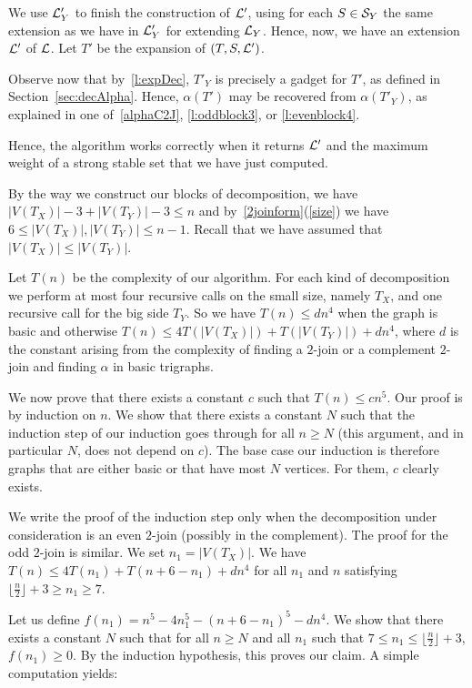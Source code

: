 \documentclass[11 pt] {article}
\newcounter{claim}
\begin{document}
We use ${\cal L}'_Y$ to finish the construction of ${\cal L}'$, 
using for each $S \in {\cal S}_Y$ the same extension as we have in
${\cal L}'_Y$ for extending ${\cal L}_Y$.  Hence, now, we have an
extension ${\cal L}'$ of ${\cal L}$.  Let $T'$ be the expansion of
$(T, S, {\cal L}')$.

Observe now that by~\ref{l:expDec}, $T'_Y$ is precisely a gadget for
$T'$, as defined in Section~\ref{sec:decAlpha}.  Hence, $\alpha(T')$
may be recovered from $\alpha(T'_Y)$, as explained in one
of~\ref{alphaC2J}, \ref{l:oddblock3}, or \ref{l:evenblock4}.

Hence, the algorithm works  correctly when it returns ${\cal L}'$ and the 
maximum weight of a strong stable set that we have just computed.

\medskip

 By the way we construct our
blocks of decomposition, we have $|V(T_X)|-3+|V(T_Y)|-3\leq n$ and
by~\ref{2joinform}(\ref{size}) we have $6\leq |V(T_X)|,|V(T_Y)| \leq
n-1$. Recall that we have assumed that $|V(T_X)|\leq |V(T_Y)|$.

Let $T(n)$ be the complexity of our algorithm. For each kind of
decomposition we perform at most four recursive calls on the small
size, namely $T_X$, and one recursive call for the big side $T_Y$.
So we have $T(n) \leq d n^4$ when the graph is basic and otherwise
$T(n) \leq 4T(|V(T_X)|) + T(|V(T_Y)|) + d n^4$, where $d$ is the
constant arising from the complexity of finding a $2$-join or a
complement $2$-join and finding $\alpha$ in basic trigraphs.


We now prove that there exists a constant $c$ such that $T(n) \leq
cn^5$.  Our proof is by induction on $n$.  We show that there exists a
constant $N$ such that the induction step of our induction goes
through for all $n\geq N$ (this argument, and in particular $N$, does
not depend on $c$).  The base case our induction is therefore graphs
that are either basic or that have most $N$ vertices.  For them, $c$
clearly exists.

We write the proof of the induction step only when the decomposition
under consideration is an even $2$-join (possibly in the complement).
The proof for the odd $2$-join is similar.  We set $n_1 = |V(T_X)|$.  We
have $T(n) \leq 4T(n_1)+T(n+6-n_1)+dn^4$ for all $n_1$ and $n$
satisfying $\lfloor\frac{n}{2}\rfloor+3\geq n_1\geq 7$.

Let us define $f(n_1)=n^5 - 4n_1^5 - (n+6-n_1)^5 - dn^4$.  We show
that there exists a constant $N$ such that for all $n\geq N$ and all
$n_1$ such that $7\leq n_1 \leq \lfloor\frac{n}{2}\rfloor+3$,
$f(n_1)\geq 0$.  By the induction hypothesis, this proves our claim. A
simple computation yields:
\end{document}
